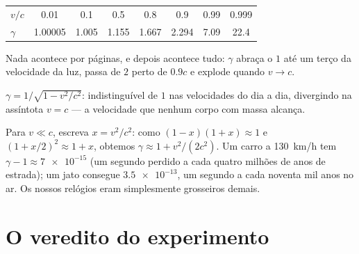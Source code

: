 \begin{example}\label{ex:g12:special-relativity:gammatable}
\begin{center}\small
\begin{tabular}{lccccccc}
$v/c$    & 0.01     & 0.1   & 0.5   & 0.8   & 0.9   & 0.99 & 0.999\\
$\gamma$ & 1.00005 & 1.005 & 1.155 & 1.667 & 2.294 & 7.09 & 22.4
\end{tabular}
\end{center}
Nada acontece por páginas, e depois acontece tudo: $\gamma$ abraça o $1$ até um terço da
velocidade da luz, passa de $2$ perto de $0.9c$ e explode quando $v \to c$.
\end{example}

\begin{omfigure}

{\small $\gamma = 1/\sqrt{1 - v^2/c^2}$: indistinguível de $1$ nas velocidades do dia a
dia, divergindo na assíntota $v = c$ --- a velocidade que nenhum corpo com massa
alcança.}
\end{omfigure}

\begin{remark}\label{rem:g12:special-relativity:everyday}
Para $v \ll c$, escreva $x = v^2/c^2$: como $(1-x)(1+x) \approx 1$ e
$(1 + x/2)^2 \approx 1 + x$, obtemos $\gamma \approx 1 + v^2/(2c^2)$. Um carro a
\qty{130}{km/h} tem $\gamma - 1 \approx \num{7e-15}$ (um segundo perdido a cada quatro
milhões de anos de estrada); um jato consegue $\num{3.5e-13}$, um segundo a cada noventa
mil anos no ar. Os nossos relógios eram simplesmente grosseiros demais.
\end{remark}

\section{O veredito do experimento}

